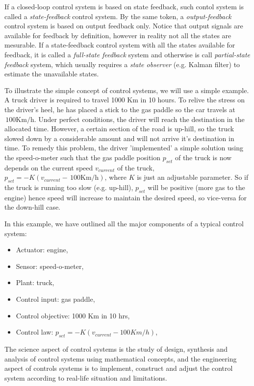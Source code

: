 \documentclass[12pt]{article}
\def\u#1{\,\mathrm{#1}}
\begin{document}
If a closed-loop control system is based on state feedback, such
contol system is called a {\em state-feedback} control system. By the
same token, a {\em output-feedback} control system is  based on output
feedback only.  Notice that output signals are available for feedback
by definition, however in reality not all the states are mesurable.  If
a state-feedback control system with all the states available for
feedback, it is called a {\em full-state feedback} system and otherwise
is call {\em partial-state feedback} system, which usually requires a {\em state
  observer} (e.g. Kalman filter) to estimate the unavailable states.

To illustrate the simple concept of control systems, we will use a
simple example.  A truck driver is required to travel 1000 Km in 10
hours.  To relive the stress on the driver's heel, he has placed a stick
to the gas paddle so the car travels at $\u{100Km/h}$.  Under perfect
conditions, the driver will reach the destination in the allocated
time.  However, a certain section of the road is up-hill, so the truck
slowed down by a considerable amount and will not arrive it's
destination in time.  To remedy this problem, the driver 'implemented'
a simple solution using the speed-o-meter such that the gas paddle position
$p_{set}$ of the truck is now depends on the current speed
$v_{current}$ of the truck, $p_{set} = -K (v_{current} - \u{100Km/h})$,
where $K$ is just an adjustable parameter.  So if the truck is running
too slow (e.g. up-hill), $p_{set}$  will be positive (more gas to the
engine) hence speed will increase to maintain the desired speed, so
vice-versa for the down-hill case.  


In this example, we have outlined all the major components of a
typical control system:

\begin{itemize}
  \item Actuator: engine,
  \item Sensor: speed-o-meter,
  \item Plant: truck,
  \item Control input: gas paddle,
  \item Control objective: 1000 Km in 10 hrs,
  \item Control law: $p_{set} = -K (v_{current} - 100Km/h)$,
\end{itemize}

The science aspect of control systems is the study of
design, synthesis and analysis of control systems using mathematical
concepts, and the engineering aspect of controls systems is to
implement, construct and adjust the control system according to
real-life situation and limitations.

\end{document}
